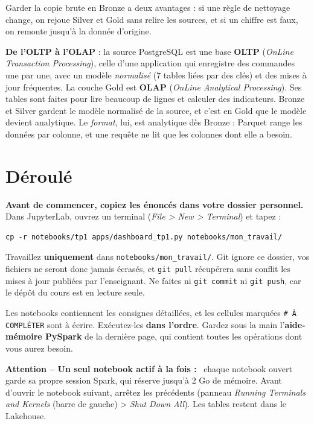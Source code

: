 \documentclass[11pt,a4paper]{article}
\newenvironment{attention}[1][]{\par\medskip\noindent\textbf{\textcolor{lhred}{Attention\if\relax\detokenize{#1}\relax\else{} -- #1\fi{} :}}\ }{\par\medskip}
\newcommand{\cmd}[1]{\texttt{#1}}
\newcommand{\nb}[1]{\textcolor{lhblue}{\texttt{#1}}}
\begin{document}
Garder la copie brute en Bronze a deux avantages : si une règle de nettoyage change, on rejoue
Silver et Gold sans relire les sources, et si un chiffre est faux, on remonte jusqu'à la donnée d'origine.

\textbf{De l'OLTP à l'OLAP} : la source PostgreSQL est une base \textbf{OLTP} (\emph{OnLine
Transaction Processing}), celle d'une application qui enregistre des commandes une par une, avec
un modèle \emph{normalisé} (7 tables liées par des clés) et des mises à jour fréquentes. La couche
Gold est \textbf{OLAP} (\emph{OnLine Analytical Processing}). Ses tables sont faites pour lire beaucoup
de lignes et calculer des indicateurs. Bronze et Silver gardent le modèle normalisé de la source,
et c'est en Gold que le modèle devient analytique. Le \emph{format}, lui, est analytique dès Bronze :
Parquet range les données par colonne, et une requête ne lit que les colonnes dont elle a besoin.

\section{Déroulé}

\textbf{Avant de commencer, copiez les énoncés dans votre dossier personnel.} Dans JupyterLab, ouvrez un
terminal (\emph{File > New > Terminal}) et tapez :
\begin{lstlisting}[style=shell]
cp -r notebooks/tp1 apps/dashboard_tp1.py notebooks/mon_travail/
\end{lstlisting}
Travaillez \textbf{uniquement} dans \nb{notebooks/mon\_travail/}. Git ignore ce dossier, vos fichiers ne
seront donc jamais écrasés, et \cmd{git pull} récupérera sans conflit les mises à jour publiées par l'enseignant.
Ne faites ni \cmd{git commit} ni \cmd{git push}, car le dépôt du cours est en lecture seule.

Les notebooks contiennent les consignes détaillées, et les cellules marquées \cmd{\# À COMPLÉTER} sont à
écrire. Exécutez-les \textbf{dans l'ordre}.
Gardez sous la main l'\textbf{aide-mémoire PySpark} de la dernière page, qui contient toutes les
opérations dont vous aurez besoin.


\begin{attention}[Un seul notebook actif à la fois]
chaque notebook ouvert garde sa propre session Spark,
qui réserve jusqu'à 2 Go de mémoire. Avant d'ouvrir le notebook suivant, arrêtez les précédents
(panneau \emph{Running Terminals and Kernels} (barre de gauche) > \emph{Shut Down All}).
Les tables restent dans le Lakehouse.
\end{attention}
\end{document}
